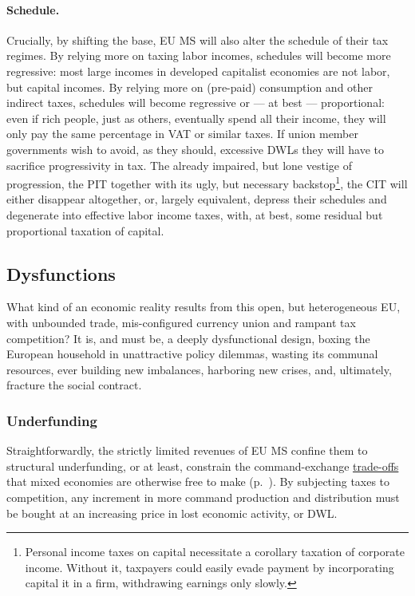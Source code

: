 \paragraph{Schedule.} Crucially, by shifting the base, \gls{EU} \gls{MS} will also alter the schedule of their tax regimes. By relying more on taxing labor incomes, schedules will become more regressive: most large incomes in developed capitalist economies are not labor, but capital incomes. By relying more on (pre-paid) consumption and other indirect taxes, schedules will become regressive or --- at best --- proportional: even if rich people, just as others, eventually spend all their income, they will only pay the same percentage in \gls{VAT} or similar taxes. If union member governments wish to avoid, as they should, excessive \glspl{DWL} they will have to sacrifice progressivity in tax. The already impaired, but lone vestige of progression, the \gls{PIT} together with its ugly, but necessary backstop\footnote{
	Personal income taxes on capital necessitate a corollary taxation of corporate income. Without it, taxpayers could easily evade payment by incorporating capital it in a firm, withdrawing earnings only slowly.}, 
the \gls{CIT} will either disappear altogether, or, largely equivalent, depress their schedules and degenerate into effective labor income taxes, with, at best, some residual but proportional taxation of capital.

\subsection{Dysfunctions} \label{sec:defunct} What kind of an economic reality results from this open, but heterogeneous \gls{EU}, with unbounded trade, mis-configured currency union and rampant tax competition? It is, and must be, a deeply dysfunctional design, boxing the European household in unattractive policy dilemmas, wasting its communal resources, ever building new imbalances, harboring new crises, and, ultimately, fracture the social contract.

\subsubsection{Underfunding} \label{sec:public-squalor} Straightforwardly, the strictly limited revenues of \gls{EU} \gls{MS} confine them to structural underfunding, or at least, constrain the command-exchange \hyperref[sec:trade-offs]{trade-offs} that mixed economies are otherwise free to make (p.~\pageref{sec:trade-offs}). %
By subjecting taxes to competition, any increment in more command production and distribution must be bought at an increasing price in lost economic activity, or \gls{DWL}. 

